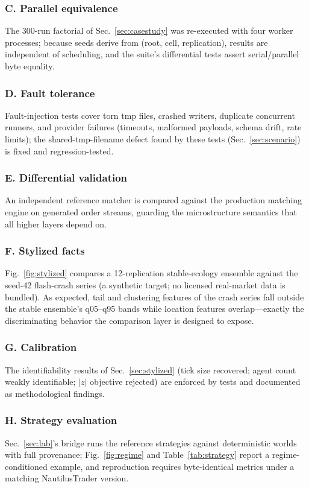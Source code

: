 \documentclass[conference]{IEEEtran}
\begin{document}
\subsubsection*{C. Parallel equivalence} The 300-run factorial of
Sec.~\ref{sec:casestudy} was re-executed with four worker processes;
because seeds derive from (root, cell, replication), results are
independent of scheduling, and the suite's differential tests assert
serial/parallel byte equality.

\subsubsection*{D. Fault tolerance} Fault-injection tests cover torn
tmp files, crashed writers, duplicate concurrent runners, and provider
failures (timeouts, malformed payloads, schema drift, rate limits);
the shared-tmp-filename defect found by these tests
(Sec.~\ref{sec:scenario}) is fixed and regression-tested.

\subsubsection*{E. Differential validation} An independent reference
matcher is compared against the production matching engine on
generated order streams, guarding the microstructure semantics that
all higher layers depend on.

\subsubsection*{F. Stylized facts} Fig.~\ref{fig:stylized} compares a
12-replication stable-ecology ensemble against the seed-42 flash-crash
series (a synthetic target; no licensed real-market data is bundled).
As expected, tail and clustering features of the crash series fall
outside the stable ensemble's q05--q95 bands while location features
overlap---exactly the discriminating behavior the comparison layer is
designed to expose.

\subsubsection*{G. Calibration} The identifiability results of
Sec.~\ref{sec:stylized} (tick size recovered; agent count weakly
identifiable; $|z|$ objective rejected) are enforced by tests and
documented as methodological findings.

\subsubsection*{H. Strategy evaluation} Sec.~\ref{sec:lab}'s bridge
runs the reference strategies against deterministic worlds with full
provenance; Fig.~\ref{fig:regime} and Table~\ref{tab:strategy} report
a regime-conditioned example, and reproduction requires byte-identical
metrics under a matching NautilusTrader version.
\end{document}
